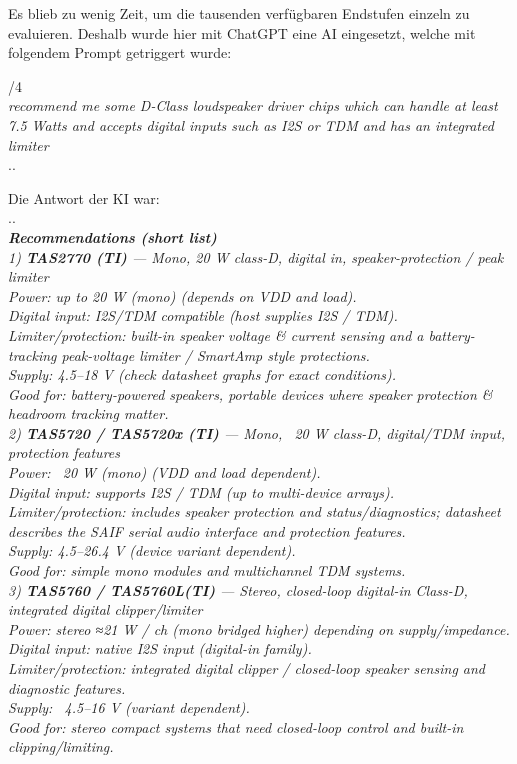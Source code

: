Es blieb zu wenig Zeit, um die tausenden verfügbaren Endstufen einzeln zu evaluieren. Deshalb wurde hier mit ChatGPT eine AI eingesetzt, welche mit folgendem Prompt getriggert wurde:\\
\begin{center}
	\begin{parbox}[][][]{/4}
		{\textit{\dotfill\\recommend me some D-Class loudspeaker driver chips which can handle at least 7.5 Watts and accepts digital inputs such as I2S or TDM and has an integrated limiter}\\.\dotfill.}
	\end{parbox}
\end{center}\vspace{3mm}
Die Antwort der KI war:\\.\dotfill.\\\textit{\textbf{{\Large Recommendations (short list})}\\
	1) \textbf{TAS2770 (TI)} — Mono, 20 W class-D, digital in, speaker-protection / peak limiter
	\\Power: up to 20 W (mono) (depends on VDD and load).\\Digital input: I2S/TDM compatible (host supplies I2S / TDM).\\Limiter/protection: built-in speaker voltage \& current sensing and a battery-tracking peak-voltage limiter / SmartAmp style protections.\\Supply: 4.5–18 V (check datasheet graphs for exact conditions).\\Good for: battery-powered speakers, portable devices where speaker protection \& headroom tracking matter.\\2) \textbf{TAS5720 / TAS5720x (TI)} — Mono, ~20 W class-D, digital/TDM input, protection features\\Power: ~20 W (mono) (VDD and load dependent).\\Digital input: supports I2S / TDM (up to multi-device arrays).\\Limiter/protection: includes speaker protection and status/diagnostics; datasheet describes the SAIF serial audio interface and protection features.\\Supply: 4.5–26.4 V (device variant dependent).\\Good for: simple mono modules and multichannel TDM systems.\\3) \textbf{TAS5760 / TAS5760L(TI)} — Stereo, closed-loop digital-in Class-D, integrated digital clipper/limiter\\Power: stereo ≈21 W / ch (mono bridged higher) depending on supply/impedance.\\Digital input: native I2S input (digital-in family).\\Limiter/protection: integrated digital clipper / closed-loop speaker sensing and diagnostic features.\\Supply: ~4.5–16 V (variant dependent).\\Good for: stereo compact systems that need closed-loop control and built-in clipping/limiting. 
}

